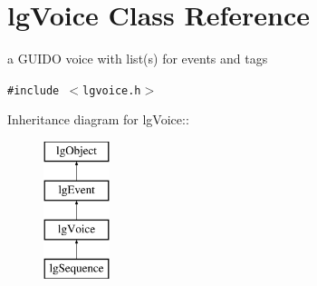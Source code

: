 \section{lg\-Voice Class Reference}
\label{classlgVoice}
a GUIDO voice with list(s) for events and tags  


{\tt \#include $<$lgvoice.h$>$}

Inheritance diagram for lg\-Voice::\begin{figure}[H]
\begin{center}
\leavevmode
\includegraphics[height=4cm]{classlgVoice}
\end{center}
\end{figure}
